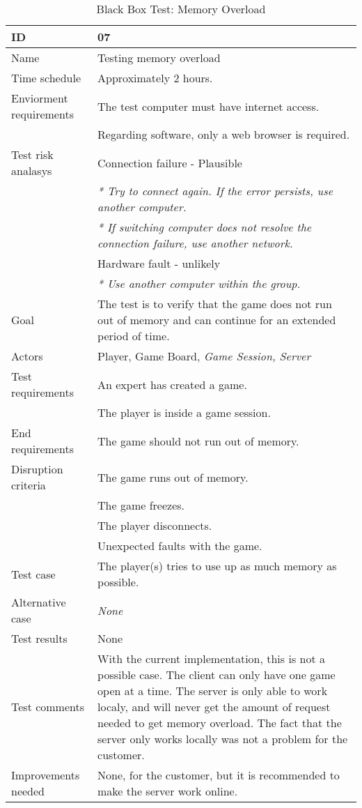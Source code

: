 {\footnotesize
\begin{table}[H]
\begin{tabular}{| p{5cm} | p{10cm} |}\hline
	\textbf{ID}	& \textbf{07} \\ \hline
	Name		& Testing memory overload\\ \hline
	Time schedule	& Approximately 2 hours.\\ \hline
	Enviorment requirements 
		& The test computer must have internet access. \\
		& Regarding software, only a web browser is required. \\ \hline
	Test risk analasys 
		& Connection failure - Plausible \\
		& \emph{* Try to connect again. If the error persists, use another computer.} \\
		& \emph{* If switching computer does not resolve the connection failure, use another network.}\\ 
		& Hardware fault - unlikely \\
		& \emph{* Use another computer within the group.} \\ \hline
	Goal	& The test is to verify that the game does not run out of memory and can continue for an extended period of time. \\ \hline
	Actors	& Player, Game Board, \emph{Game Session, Server} \\ \hline
	Test requirements
		& An expert has created a game.\\
		& The player is inside a game session.\\ \hline
	End requirements 
		& The game should not run out of memory.\\ \hline
	Disruption criteria 
		& The game runs out of memory. \\
		& The game freezes. \\
		& The player disconnects.\\
		& Unexpected faults with the game.\\ \hline
	Test case
		& The player(s) tries to use up as much memory as possible.\\ \hline
	Alternative case
		& \emph{None}\\ \hline
	Test results 
		& None \\ \hline
	Test comments
		& With the current implementation, this is not a possible case. The client can only have one game open
			at a time. The server is only able to work localy, and will never get the amount of request 
			needed to get memory overload. The fact that the server only works locally was not a problem
			for the customer. \\ \hline
	Improvements needed
		& None, for the customer, but it is recommended to make the server work online. \\ \hline
\end{tabular}


\caption{Black Box Test: Memory Overload}
\label{fig:black_box_test_7}
\end{table}}



